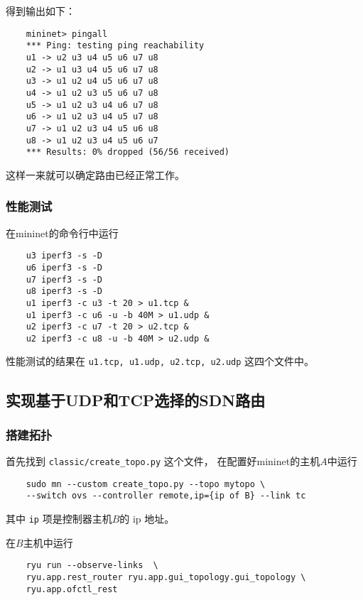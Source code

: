 得到输出如下：

\begin{lstlisting}
	mininet> pingall
	*** Ping: testing ping reachability
	u1 -> u2 u3 u4 u5 u6 u7 u8 
	u2 -> u1 u3 u4 u5 u6 u7 u8 
	u3 -> u1 u2 u4 u5 u6 u7 u8 
	u4 -> u1 u2 u3 u5 u6 u7 u8 
	u5 -> u1 u2 u3 u4 u6 u7 u8 
	u6 -> u1 u2 u3 u4 u5 u7 u8 
	u7 -> u1 u2 u3 u4 u5 u6 u8 
	u8 -> u1 u2 u3 u4 u5 u6 u7 
	*** Results: 0% dropped (56/56 received)
\end{lstlisting}

这样一来就可以确定路由已经正常工作。

\subsubsection{性能测试}

在mininet的命令行中运行

\begin{lstlisting}
	u3 iperf3 -s -D
	u6 iperf3 -s -D
	u7 iperf3 -s -D
	u8 iperf3 -s -D
	u1 iperf3 -c u3 -t 20 > u1.tcp &
	u1 iperf3 -c u6 -u -b 40M > u1.udp &
	u2 iperf3 -c u7 -t 20 > u2.tcp &
	u2 iperf3 -c u8 -u -b 40M > u2.udp &
\end{lstlisting}

性能测试的结果在 \texttt{u1.tcp, u1.udp, u2.tcp, u2.udp} 这四个文件中。

\subsection{实现基于UDP和TCP选择的SDN路由}

\subsubsection{搭建拓扑}

首先找到 \texttt{classic/create\_{}topo.py} 这个文件，
在配置好mininet的主机$A$中运行
\begin{lstlisting}
	sudo mn --custom create_topo.py --topo mytopo \
	--switch ovs --controller remote,ip={ip of B} --link tc
\end{lstlisting}

其中 \texttt{ip} 项是控制器主机$B$的 ip 地址。

在$B$主机中运行

\begin{lstlisting}
	ryu run --observe-links  \
	ryu.app.rest_router ryu.app.gui_topology.gui_topology \
	ryu.app.ofctl_rest
\end{lstlisting}

